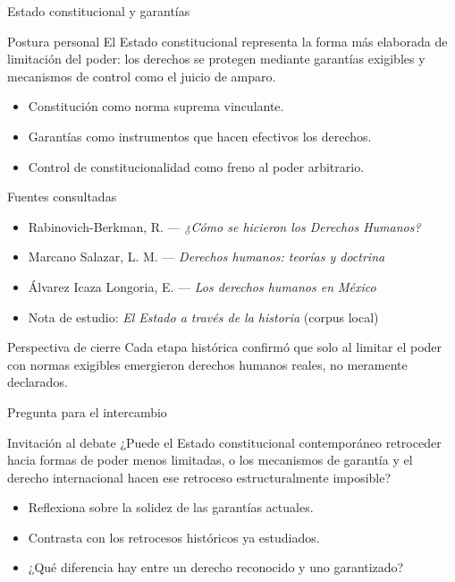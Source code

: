 \documentclass[
  spanish,
  aspectratio=169,
  xcolor={dvipsnames,table}
]{beamer}
\begin{document}
\begin{frame}{Estado constitucional y garantías}
  \begin{block}{Postura personal}
    El Estado constitucional representa la forma más elaborada de limitación del poder: los derechos se protegen mediante garantías exigibles y mecanismos de control como el juicio de amparo.
  \end{block}
  \begin{itemize}
    \item Constitución como norma suprema vinculante.
    \item Garantías como instrumentos que hacen efectivos los derechos.
    \item Control de constitucionalidad como freno al poder arbitrario.
  \end{itemize}
\end{frame}

\begin{frame}{Fuentes consultadas}
  \begin{itemize}
    \item Rabinovich-Berkman, R. --- \textit{¿Cómo se hicieron los Derechos Humanos?}
    \item Marcano Salazar, L. M. --- \textit{Derechos humanos: teorías y doctrina}
    \item Álvarez Icaza Longoria, E. --- \textit{Los derechos humanos en México}
    \item Nota de estudio: \textit{El Estado a través de la historia} (corpus local)
  \end{itemize}
  \begin{block}{Perspectiva de cierre}
    Cada etapa histórica confirmó que solo al limitar el poder con normas exigibles emergieron derechos humanos reales, no meramente declarados.
  \end{block}
\end{frame}

\begin{frame}{Pregunta para el intercambio}
  \begin{block}{Invitación al debate}
    ¿Puede el Estado constitucional contemporáneo retroceder hacia formas de poder menos limitadas, o los mecanismos de garantía y el derecho internacional hacen ese retroceso estructuralmente imposible?
  \end{block}
  \vspace{0.35cm}
  \begin{itemize}
    \item Reflexiona sobre la solidez de las garantías actuales.
    \item Contrasta con los retrocesos históricos ya estudiados.
    \item ¿Qué diferencia hay entre un derecho reconocido y uno garantizado?
  \end{itemize}
\end{frame}
\end{document}
